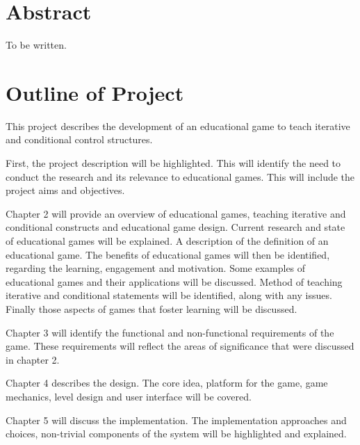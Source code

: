\documentclass[a4paper,11.5pt]{report}
\numberwithin{figure}{section}
\numberwithin{table}{section}
\numberwithin{equation}{section}
\numberwithin{equation}{section}
\newcommand\blankpage{%
    \null
    \thispagestyle{empty}%
    \addtocounter{page}{-1}%
    \newpage}
\begin{document}
\afterpage{\blankpage}

\hfill

\section*{\Huge{Abstract}}

To be written.



\newpage

\tableofcontents

\newpage
{%
\let\oldnumberline\numberline%
\renewcommand{\numberline}{\figurename~\oldnumberline}%
\listoffigures%
}

\newpage
\listoftables  

\newpage
\hfill

\section*{\Huge{Outline of Project}}

This project describes the development of an educational game to teach iterative and conditional control structures.

First, the project description will be highlighted. This will identify the need to conduct the research and its relevance to educational games. This will include the project aims and objectives.

Chapter 2 will provide an overview of educational games, teaching iterative and conditional constructs and educational game design. Current research and state of educational games will be explained. A description of the definition of an educational game. The benefits of educational games will then be identified, regarding the learning, engagement and motivation. Some examples of educational games and their applications will be discussed. Method of teaching iterative and conditional statements will be identified, along with any issues. Finally those aspects of games that foster learning will be discussed.

Chapter 3 will identify the functional and non-functional requirements of the game. These requirements will reflect the areas of significance that were discussed in chapter 2.

Chapter 4 describes the design. The core idea, platform for the game, game mechanics, level design and user interface will be covered. 

Chapter 5 will discuss the implementation. The implementation approaches and choices, non-trivial components of the system will be highlighted and explained.
\end{document}
